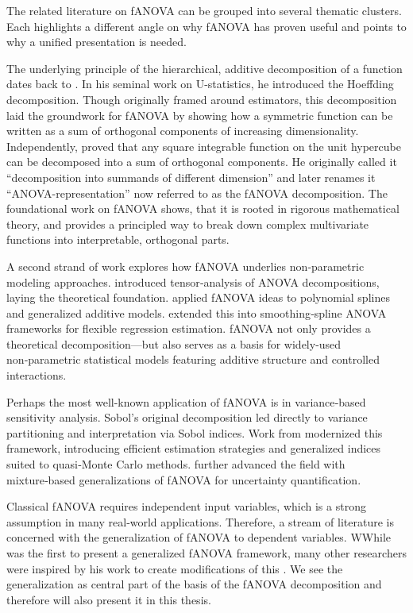 The related literature on fANOVA can be grouped into several thematic clusters. Each highlights a different angle on why fANOVA has proven useful and points to why a unified presentation is needed.\par

The underlying principle of the hierarchical, additive decomposition of a function dates back to \cite{hoeffding1948}. In his seminal work on U-statistics, he introduced the Hoeffding decomposition.
Though originally framed around estimators, this decomposition laid the groundwork for fANOVA by showing how a symmetric function can be written as a sum of orthogonal components of increasing dimensionality.
Independently, \cite{sobol1993sensitivity} proved that any square integrable function on the unit hypercube can be decomposed into a sum of orthogonal components. He originally called it ``decomposition into summands of different dimension'' and later renames it ``ANOVA-representation'' \citep{sobol2001} now referred to as the fANOVA decomposition.
The foundational work on fANOVA shows, that it is rooted in rigorous mathematical theory, and provides a principled way to break down complex multivariate functions into interpretable, orthogonal parts.\par

A second strand of work explores how fANOVA underlies non‑parametric modeling approaches.
\cite{takemura1983} introduced tensor‑analysis of ANOVA decompositions, laying the theoretical foundation. \cite{stone1994} applied fANOVA ideas to polynomial splines and generalized additive models. \cite{gu2013} extended this into smoothing‑spline ANOVA frameworks for flexible regression estimation. fANOVA not only provides a theoretical decomposition—but also serves as a basis for widely-used non‑parametric statistical models featuring additive structure and controlled interactions.\par

Perhaps the most well-known application of fANOVA is in variance‑based sensitivity analysis. Sobol’s original decomposition led directly to variance partitioning and interpretation via Sobol indices. 
Work from \cite{owen2013, owen2014} modernized this framework, introducing efficient estimation strategies and generalized indices suited to quasi‑Monte Carlo methods. \cite{borgonovo2022} further advanced the field with mixture‑based generalizations of fANOVA for uncertainty quantification.\par

Classical fANOVA requires independent input variables, which is a strong assumption in many real‑world applications. Therefore, a stream of literature is concerned with the generalization of fANOVA to dependent variables. WWhile \cite{hooker2007} was the first to present a generalized fANOVA framework, many other researchers were inspired by his work to create modifications of this \cite{rahman2014,chastaing2012,ilidrissi2025}.
We see the generalization as central part of the basis of the fANOVA decomposition and therefore will also present it in this thesis.\par


